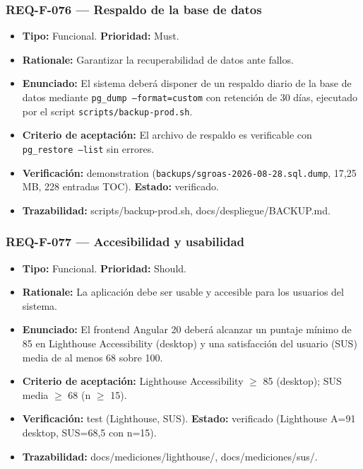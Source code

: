\documentclass[12pt,a4paper]{article}
\begin{document}
\subsubsection{REQ-F-076 --- Respaldo de la base de datos}
\begin{itemize}
  \item \textbf{Tipo:} Funcional. \textbf{Prioridad:} Must.
  \item \textbf{Rationale:} Garantizar la recuperabilidad de datos ante fallos.
  \item \textbf{Enunciado:} El sistema deberá disponer de un respaldo diario de la base de datos mediante \texttt{pg\_dump --format=custom} con retención de 30 días, ejecutado por el script \texttt{scripts/backup-prod.sh}.
  \item \textbf{Criterio de aceptación:} El archivo de respaldo es verificable con \texttt{pg\_restore --list} sin errores.
  \item \textbf{Verificación:} demonstration (\texttt{backups/sgroas-2026-08-28.sql.dump}, 17,25 MB, 228 entradas TOC). \textbf{Estado:} verificado.
  \item \textbf{Trazabilidad:} scripts/backup-prod.sh, docs/despliegue/BACKUP.md.
\end{itemize}

\subsubsection{REQ-F-077 --- Accesibilidad y usabilidad}
\begin{itemize}
  \item \textbf{Tipo:} Funcional. \textbf{Prioridad:} Should.
  \item \textbf{Rationale:} La aplicación debe ser usable y accesible para los usuarios del sistema.
  \item \textbf{Enunciado:} El frontend Angular 20 deberá alcanzar un puntaje mínimo de 85 en Lighthouse Accessibility (desktop) y una satisfacción del usuario (SUS) media de al menos 68 sobre 100.
  \item \textbf{Criterio de aceptación:} Lighthouse Accessibility $\ge$ 85 (desktop); SUS media $\ge$ 68 (n $\ge$ 15).
  \item \textbf{Verificación:} test (Lighthouse, SUS). \textbf{Estado:} verificado (Lighthouse A=91 desktop, SUS=68,5 con n=15).
  \item \textbf{Trazabilidad:} docs/mediciones/lighthouse/, docs/mediciones/sus/.
\end{itemize}
\end{document}
